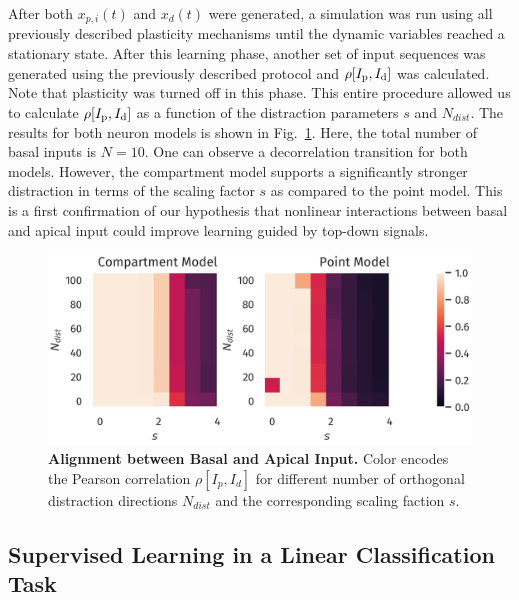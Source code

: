 \documentclass[10pt,a4paper,twocolumn]{article}
\begin{document}
		After both $x_{p,i}(t)$ and $x_d(t)$ were generated,
		a simulation was run using all previously described plasticity
		mechanisms until the dynamic variables reached a stationary state.
		After this learning phase, another set of input sequences was generated
		using the previously described protocol and $\rho[I_{\rm p},I_{\rm d}]$ was calculated.
		Note that plasticity was turned off in this phase. This entire procedure
		allowed us to calculate $\rho[I_{\rm p},I_{\rm d}]$ as a function of the distraction
		parameters $s$ and $N_{dist}$. The results for both neuron models 
		is shown in Fig.~\ref{fig:corr_dimension_scaling}. Here, the total number of 
		basal inputs is $N=10$. One can observe a decorrelation transition for 
		both models. However, the compartment model supports a significantly stronger
		distraction in terms of the scaling factor $s$ as compared to the point model.
		This is a first confirmation of our hypothesis that nonlinear interactions
		between basal and apical input could improve learning guided by top-down signals.
		
		\begin{figure}
			\includegraphics[width=\columnwidth]{corr_dimension_scaling_high_input_dim}
			\caption{{\bf Alignment between Basal and Apical Input.} Color
			encodes the Pearson correlation $\rho[I_p,I_d]$ for different
			number of orthogonal distraction directions $N_{dist}$ 
			and the corresponding scaling faction $s$.}
			\label{fig:corr_dimension_scaling}
		\end{figure}
		
		\subsection{Supervised Learning in a Linear Classification Task}
		\label{sect:classification}
		
\end{document}

